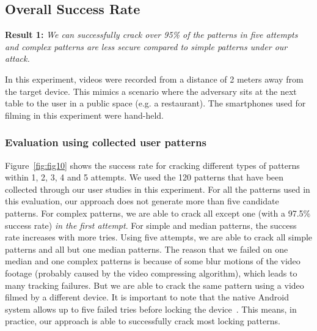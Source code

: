     \subsection{Overall Success Rate \label{sec:overall_rate}}

    \noindent \textbf{Result 1:}  \emph{We can successfully crack over 95\% of the patterns in five attempts and complex patterns are less secure compared to simple patterns under our attack.}


        In this experiment, videos were recorded from a distance of 2 meters away
        from the target device. This mimics a scenario where the adversary sits
        at the next table to the user in a public space (e.g. a restaurant).
        The smartphones used for filming in this experiment were hand-held.

        \subsubsection{Evaluation using collected user patterns}
        Figure~\ref{fig:fig10}
        shows the success rate for cracking different types of patterns within 1, 2, 3, 4 and 5 attempts.
        We used the 120 patterns that have been collected through our user studies in this experiment.
        For all the patterns used in this evaluation,
        our approach does not generate more than  five candidate patterns.
        For complex patterns, we are able to crack all except one (with a 97.5\% success rate) \emph{in the first attempt}.
        For simple and median patterns, the success rate increases with more tries.
        Using five attempts, we are able to
        crack all simple patterns and all but one median patterns.
       The reason that we failed on one median and one complex patterns is because of some blur motions of the video footage (probably
       caused by the video compressing algorithm), which leads
       to many tracking failures. But we are able to crack the same
       pattern using a video filmed by a different device.
        It is important to note that the native Android system allows up to five failed tries before locking the device~\cite{egelman2014you}. This means, in practice, our approach is able to
        successfully crack most locking patterns.

